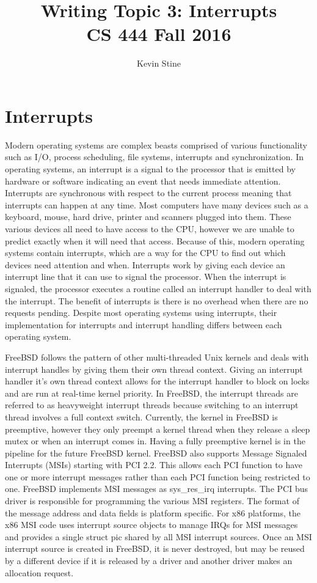 \documentclass[letterpaper,10pt,draftclsnofoot,onecolumn,titlepage]{IEEEtran}
\def\name{Kevin Stine}
\begin{document}
	\title{\huge Writing Topic 3: Interrupts\\CS 444 Fall 2016}
	\author{\large \name}
	\maketitle
	\newpage
	\section*{Interrupts}
		Modern operating systems are complex beasts comprised of various functionality such as I/O, process scheduling, file systems, interrupts and synchronization.
		In operating systems, an interrupt is a signal to the processor that is emitted by hardware or software indicating an event that needs immediate attention.
		Interrupts are synchronous with respect to the current process meaning that interrupts can happen at any time.
		Most computers have many devices such as a keyboard, mouse, hard drive, printer and scanners plugged into them.
		These various devices all need to have access to the CPU, however we are unable to predict exactly when it will need that access.
		Because of this, modern operating systems contain interrupts, which are a way for the CPU to find out which devices need attention and when.
		Interrupts work by giving each device an interrupt line that it can use to signal the processor.
		When the interrupt is signaled, the processor executes a routine called an interrupt handler to deal with the interrupt.
		The benefit of interrupts is there is no overhead when there are no requests pending.
		Despite most operating systems using interrupts, their implementation for interrupts and interrupt handling differs between each operating system.


		FreeBSD follows the pattern of other multi-threaded Unix kernels and deals with interrupt handles by giving them their own thread context.
		Giving an interrupt handler it's own thread context allows for the interrupt handler to block on locks and are run at real-time kernel priority.
		In FreeBSD, the interrupt threads are referred to as heavyweight interrupt threads because switching to an interrupt thread involves a full context switch.
		Currently, the kernel in FreeBSD is preemptive, however they only preempt a kernel thread when they release a sleep mutex or when an interrupt comes in.
		Having a fully preemptive kernel is in the pipeline for the future FreeBSD kernel.
		FreeBSD also supports Message Signaled Interrupts (MSIs) starting with PCI 2.2. This allows each PCI function to have one or more interrupt messages rather than each PCI function being restricted to one.
		FreeBSD implements MSI messages as sys\_res\_irq interrupts. The PCI bus driver is responsible for programming the various MSI registers.
		The format of the message address and data fields is platform specific.
		For x86 platforms, the x86 MSI code uses interrupt source objects to manage IRQs for MSI messages and provides a single struct pic shared by all MSI interrupt sources.
		Once an MSI interrupt source is created in FreeBSD, it is never destroyed, but may be reused by a different device if it is released by a driver and another driver makes an allocation request.
\end{document}
